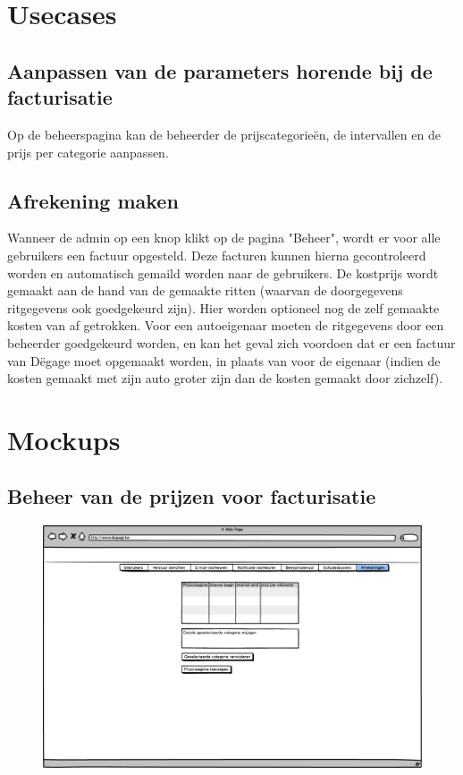 \documentclass[11pt,a4paper,oneside]{article}
\begin{document}
\section{Usecases}
\subsection{Aanpassen van de parameters horende bij de facturisatie}
Op de beheerspagina kan de beheerder de prijscategorie\"{e}n, de intervallen en de prijs per categorie aanpassen.

\subsection{Afrekening maken}
Wanneer de admin op een knop klikt op de pagina "Beheer", wordt er voor alle gebruikers een factuur opgesteld. Deze facturen kunnen hierna gecontroleerd worden en automatisch gemaild worden naar de gebruikers. De kostprijs wordt gemaakt aan de hand van de gemaakte ritten (waarvan de doorgegevens ritgegevens ook goedgekeurd zijn). Hier worden optioneel nog de zelf gemaakte kosten van af getrokken. Voor een autoeigenaar moeten de ritgegevens door een beheerder goedgekeurd worden, en kan het geval zich voordoen dat er een factuur van D\"{e}gage moet opgemaakt worden, in plaats van voor de eigenaar (indien de kosten gemaakt met zijn auto groter zijn dan de kosten gemaakt door zichzelf).

\section{Mockups}
\subsection{Beheer van de prijzen voor facturisatie}
\begin{figure}[H]\includegraphics[width=\textwidth]{../../mockups/admin_afrekening_voorkeuren.png}\end{figure}
\end{document}
